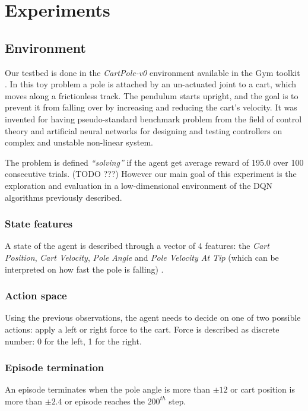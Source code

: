 \section{Experiments}

\subsection{Environment}
Our testbed is done in the \textit{CartPole-v0} environment available in the Gym toolkit \cite{Gym}.
In this toy problem a pole is attached by an un-actuated joint to a cart, which moves along a frictionless track. The pendulum starts upright, and the goal is to prevent it from falling over by increasing and reducing the cart's velocity. It was invented for having pseudo-standard benchmark problem from the field of control theory and artificial neural networks for designing and testing controllers on complex and unstable non-linear system.

The problem is defined \textit{``solving''} if the agent get average reward of 195.0 over 100 consecutive trials. (TODO ???) However our main goal of this experiment is the exploration and evaluation in a low-dimensional environment of the DQN algorithms previously described.
 
\subsubsection{State features}
A state of the agent is described through a vector of 4 features: the  \textit{Cart Position}, \textit{Cart Velocity}, \textit{Pole Angle} and \textit{Pole Velocity At Tip} (which can be interpreted on how fast the pole is falling) .

\subsubsection{Action space}
Using the previous observations, the agent needs to decide on one of two possible actions: apply a left or right force to the cart. Force is described as discrete number: 0 for the left, 1 for the right.




\subsubsection{Episode termination}
An episode terminates when the pole angle is more than $\pm12$ or cart position is more than $\pm2.4$ or episode reaches the $200^{th}$ step.

